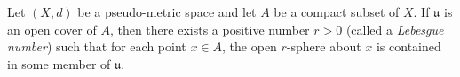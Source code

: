 Let $(X, d)$ be a pseudo-metric space and let $A$ be a compact subset of $X$. If $\mathfrak{u}$ is an open cover of $A$, then there exists a positive number $r > 0$ (called a \emph{Lebesgue number}) such that for each point $x \in A$, the open $r$-sphere about $x$ is contained in some member of $\mathfrak{u}$.
